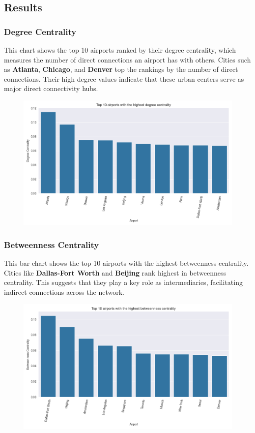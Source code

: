 \documentclass[12pt]{article}
\begin{document}
\subsection{Results}
\subsubsection{Degree Centrality}
This chart shows the top 10 airports ranked by their degree centrality, which measures the number of direct connections an airport has with others. Cities such as \textbf{Atlanta}, \textbf{Chicago}, and \textbf{Denver} top the rankings by the number of direct connections. Their high degree values indicate that these urban centers serve as major direct connectivity hubs.

\begin{figure}[H]
    \centering
    \includegraphics[width=0.8\linewidth]{img/degree_centrality.png}
\end{figure}

\subsubsection{Betweenness Centrality}
This bar chart shows the top 10 airports with the highest betweenness centrality. Cities like \textbf{Dallas-Fort Worth} and \textbf{Beijing} rank highest in betweenness centrality. This suggests that they play a key role as intermediaries, facilitating indirect connections across the network.

\begin{figure}[H]
    \centering
    \includegraphics[width=0.8\linewidth]{img/betweenness_centrality.png}
\end{figure}
\end{document}
